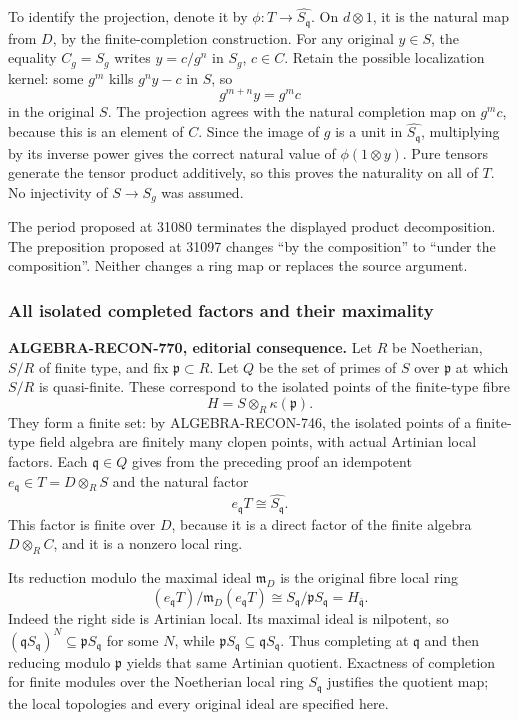 To identify the projection, denote it by \(\phi:T\to\widehat{S_{\mathfrak q}}\). On \(d\otimes1\), it is the natural map from \(D\), by the finite-completion construction. For any original \(y\in S\), the equality \(C_g=S_g\) writes \(y=c/g^n\) in \(S_g\), \(c\in C\). Retain the possible localization kernel: some \(g^m\) kills \(g^ny-c\) in \(S\), so \[
 g^{m+n}y=g^m c
\] in the original \(S\). The projection agrees with the natural completion map on \(g^mc\), because this is an element of \(C\). Since the image of \(g\) is a unit in \(\widehat{S_{\mathfrak q}}\), multiplying by its inverse power gives the correct natural value of \(\phi(1\otimes y)\). Pure tensors generate the tensor product additively, so this proves the naturality on all of \(T\). No injectivity of \(S\to S_g\) was assumed.

The period proposed at 31080 terminates the displayed product decomposition. The preposition proposed at 31097 changes ``by the composition'' to ``under the composition''. Neither changes a ring map or replaces the source argument.

\subsubsection{All isolated completed factors and their maximality}\label{all-isolated-completed-factors-and-their-maximality}

\textbf{ALGEBRA-RECON-770, editorial consequence.} Let \(R\) be Noetherian, \(S/R\) of finite type, and fix \(\mathfrak p\subset R\). Let \(Q\) be the set of primes of \(S\) over \(\mathfrak p\) at which \(S/R\) is quasi-finite. These correspond to the isolated points of the finite-type fibre \[
 H=S\otimes_R\kappa(\mathfrak p).
\] They form a finite set: by ALGEBRA-RECON-746, the isolated points of a finite-type field algebra are finitely many clopen points, with actual Artinian local factors. Each \(\mathfrak q\in Q\) gives from the preceding proof an idempotent \(e_{\mathfrak q}\in T=D\otimes_R S\) and the natural factor \[
 e_{\mathfrak q}T\cong\widehat{S_{\mathfrak q}}.
\] This factor is finite over \(D\), because it is a direct factor of the finite algebra \(D\otimes_R C\), and it is a nonzero local ring.

Its reduction modulo the maximal ideal \(\mathfrak m_D\) is the original fibre local ring \[
 (e_{\mathfrak q}T)/\mathfrak m_D(e_{\mathfrak q}T)
 \cong S_{\mathfrak q}/\mathfrak pS_{\mathfrak q}
 =H_{\bar{\mathfrak q}}.
 \tag{4}
\] Indeed the right side is Artinian local. Its maximal ideal is nilpotent, so \((\mathfrak qS_{\mathfrak q})^N\subseteq\mathfrak pS_{\mathfrak q}\) for some \(N\), while \(\mathfrak pS_{\mathfrak q}\subseteq\mathfrak qS_{\mathfrak q}\). Thus completing at \(\mathfrak q\) and then reducing modulo \(\mathfrak p\) yields that same Artinian quotient. Exactness of completion for finite modules over the Noetherian local ring \(S_{\mathfrak q}\) justifies the quotient map; the local topologies and every original ideal are specified here.

